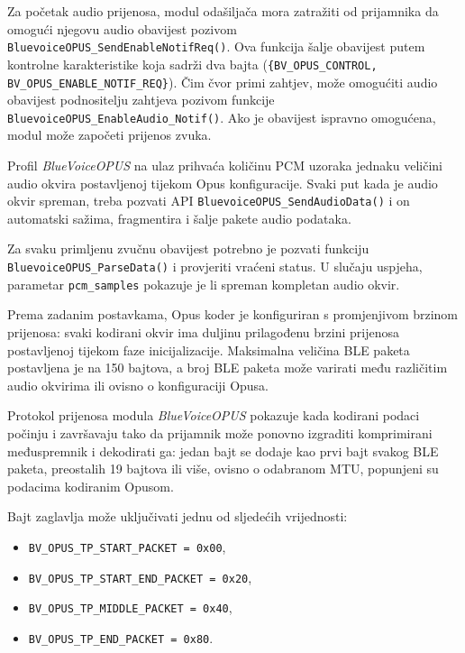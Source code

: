 Za početak audio prijenosa, modul odašiljača mora zatražiti od prijamnika da omogući njegovu audio obavijest pozivom \\\lstinline|BluevoiceOPUS_SendEnableNotifReq()|. Ova funkcija šalje obavijest putem kontrolne karakteristike koja sadrži dva bajta (\lstinline|{BV_OPUS_CONTROL, BV_OPUS_ENABLE_NOTIF_REQ}|). Čim čvor primi zahtjev, može omogućiti audio obavijest podnositelju zahtjeva pozivom funkcije \newline \lstinline|BluevoiceOPUS_EnableAudio_Notif()|. Ako je obavijest ispravno omogućena, modul može započeti prijenos zvuka.

Profil \textit{BlueVoiceOPUS} na ulaz prihvaća količinu PCM uzoraka jednaku veličini audio okvira postavljenoj tijekom Opus konfiguracije. Svaki put kada je audio okvir spreman, treba pozvati API \lstinline|BluevoiceOPUS_SendAudioData()| i on automatski sažima, fragmentira i šalje pakete audio podataka.

Za svaku primljenu zvučnu obavijest potrebno je pozvati funkciju \newline \lstinline|BluevoiceOPUS_ParseData()| i provjeriti vraćeni status. U slučaju uspjeha, parametar \lstinline|pcm_samples| pokazuje je li spreman kompletan audio okvir.

Prema zadanim postavkama, Opus koder je konfiguriran s promjenjivom brzinom prijenosa: svaki kodirani okvir ima  duljinu prilagođenu brzini prijenosa postavljenoj tijekom faze inicijalizacije. Maksimalna veličina BLE paketa postavljena je na 150 bajtova, a broj BLE paketa može varirati među različitim audio okvirima ili ovisno o konfiguraciji Opusa.

Protokol prijenosa modula \textit{BlueVoiceOPUS} pokazuje kada kodirani podaci počinju i završavaju tako da prijamnik može ponovno izgraditi komprimirani međuspremnik i dekodirati ga: jedan bajt se dodaje kao prvi bajt svakog BLE paketa, preostalih 19 bajtova ili više, ovisno o odabranom MTU, popunjeni su podacima kodiranim Opusom.

Bajt zaglavlja može uključivati jednu od sljedećih vrijednosti:
\begin{itemize}
	\item \lstinline|BV_OPUS_TP_START_PACKET = 0x00|,
	\item \lstinline|BV_OPUS_TP_START_END_PACKET = 0x20|,
	\item \lstinline|BV_OPUS_TP_MIDDLE_PACKET = 0x40|,
	\item \lstinline|BV_OPUS_TP_END_PACKET = 0x80|.
\end{itemize}

